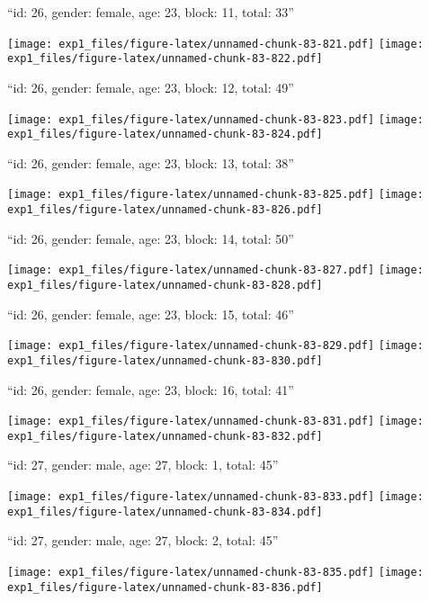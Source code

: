 \documentclass[11pt,,]{article}
\begin{document}
\newpage
[1] 

``id: 26, gender: female, age: 23, block: 11, total: 33''

\texttt{[image: exp1\_files/figure-latex/unnamed-chunk-83-821.pdf]}
\texttt{[image: exp1\_files/figure-latex/unnamed-chunk-83-822.pdf]}

\newpage
[1] 

``id: 26, gender: female, age: 23, block: 12, total: 49''

\texttt{[image: exp1\_files/figure-latex/unnamed-chunk-83-823.pdf]}
\texttt{[image: exp1\_files/figure-latex/unnamed-chunk-83-824.pdf]}

\newpage
[1] 

``id: 26, gender: female, age: 23, block: 13, total: 38''

\texttt{[image: exp1\_files/figure-latex/unnamed-chunk-83-825.pdf]}
\texttt{[image: exp1\_files/figure-latex/unnamed-chunk-83-826.pdf]}

\newpage
[1] 

``id: 26, gender: female, age: 23, block: 14, total: 50''

\texttt{[image: exp1\_files/figure-latex/unnamed-chunk-83-827.pdf]}
\texttt{[image: exp1\_files/figure-latex/unnamed-chunk-83-828.pdf]}

\newpage
[1] 

``id: 26, gender: female, age: 23, block: 15, total: 46''

\texttt{[image: exp1\_files/figure-latex/unnamed-chunk-83-829.pdf]}
\texttt{[image: exp1\_files/figure-latex/unnamed-chunk-83-830.pdf]}

\newpage
[1] 

``id: 26, gender: female, age: 23, block: 16, total: 41''

\texttt{[image: exp1\_files/figure-latex/unnamed-chunk-83-831.pdf]}
\texttt{[image: exp1\_files/figure-latex/unnamed-chunk-83-832.pdf]}

\newpage
[1] 

``id: 27, gender: male, age: 27, block: 1, total: 45''

\texttt{[image: exp1\_files/figure-latex/unnamed-chunk-83-833.pdf]}
\texttt{[image: exp1\_files/figure-latex/unnamed-chunk-83-834.pdf]}

\newpage
[1] 

``id: 27, gender: male, age: 27, block: 2, total: 45''

\texttt{[image: exp1\_files/figure-latex/unnamed-chunk-83-835.pdf]}
\texttt{[image: exp1\_files/figure-latex/unnamed-chunk-83-836.pdf]}
\end{document}
